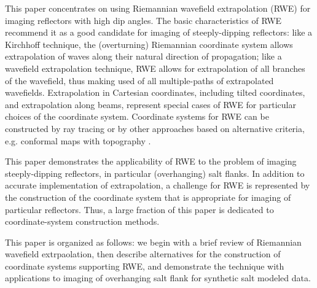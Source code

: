 \par
This paper concentrates on using Riemannian wavefield extrapolation (RWE) for imaging reflectors with high dip angles. The basic characteristics of RWE recommend it as a good candidate for imaging of steeply-dipping reflectors: 
like a Kirchhoff technique, the (overturning) Riemannian coordinate system allows extrapolation of waves along their natural direction of propagation;
like a wavefield extrapolation technique, RWE allows for extrapolation of all branches of the wavefield, thus making used of all multiple-paths of extrapolated wavefields. 
Extrapolation in Cartesian coordinates, including tilted coordinates, and extrapolation along beams, represent special cases of RWE for particular choices of the coordinate system. Coordinate systems for RWE can be constructed by ray tracing or by other approaches based on alternative criteria, e.g. conformal maps with topography \cite[]{ShraggeSava.segab.2005}.
\par
This paper demonstrates the applicability of RWE to the problem of imaging steeply-dipping reflectors, in particular (overhanging) salt flanks. In addition to accurate implementation of extrapolation, a challenge for RWE is represented by the construction of the coordinate system that is appropriate for imaging of particular reflectors. Thus, a large fraction of this paper is dedicated to coordinate-system construction methods.
\par
This paper is organized as follows: we begin with a brief review of Riemannian wavefield extrpaolation, then describe alternatives for the construction of coordinate systems supporting RWE, and demonstrate the technique with applications to imaging of overhanging salt flank for synthetic salt modeled data.